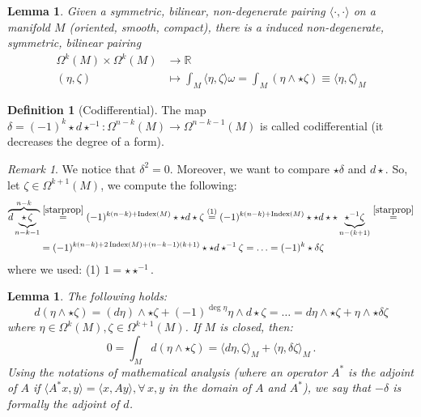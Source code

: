 \documentclass[a4paper,11pt,titlepage, article, oneside]{memoir}
\numberwithin{equation}{section}
\newtheorem{lemma}[theorem]{Lemma}
\theoremstyle{definition}
\newtheorem{definition}[theorem]{Definition}
\theoremstyle{remark}
\newtheorem{remark}[theorem]{Remark}
\DeclareMathOperator{\Index}{Index}
\newcommand{\rfield}{\mathbb{R}}
\begin{document}
\begin{lemma}
Given a symmetric, bilinear, non-degenerate pairing $\langle\cdot, \cdot \rangle$ on a manifold $M$ (oriented, smooth, compact), there is a induced non-degenerate, symmetric, bilinear pairing
\begin{align}
\Omega^k(M) \times \Omega^k(M) &\rightarrow \rfield \\
(\eta, \zeta) &\mapsto \int_M\langle \eta, \zeta \rangle \omega = \int_M (\eta \wedge \star \zeta) \equiv \langle \eta, \zeta \rangle_M \nonumber
\end{align}
 \end{lemma}

\begin{definition} [Codifferential]
The map $\delta = (-1)^k \star d \star^{-1} \colon \Omega^{n-k}(M) \rightarrow \Omega^{n-k-1}(M)$ is called codifferential (it decreases the degree of a form).
\end{definition}

\begin{remarkbox}\begin{remark}
We notice that $\delta^2 = 0$. Moreover, we want to compare $\star \delta $ and $d \star$. So, let $\zeta \in \Omega^{k+1}(M)$, we compute the following:
\begin{align*}
\overbrace{d \underbrace{\star\, \zeta}_{n-k-1}}^{n-k} &\overset{\eqref{starprop}}{=} (-1)^{k(n-k) + \Index(M)} \star \star d \star \zeta \overset{(1)}{=} (-1)^{k(n-k) + \Index(M)} \star \star d \star \star \underbrace{\star^{-1} \zeta}_{n-(k+1)} \overset{\eqref{starprop}}{=} \\
&=(-1)^{k(n-k) + 2\Index(M) + (n-k-1)(k+1)} \star \star d \star^{-1} \zeta = \ldots = (-1)^k \star \delta \zeta
\end{align*}
where we used: (1) $1=\star \star^{-1}$.
\end{remark}\end{remarkbox}

\begin{lemma} The following holds:
\begin{equation}
d(\eta \wedge \star \zeta) = (d\eta) \wedge \star \zeta + (-1)^{\deg \eta} \eta \wedge d \star \zeta = \ldots = d \eta \wedge \star \zeta + \eta \wedge \star \delta \zeta
\end{equation}
where $\eta \in \Omega^k(M), \zeta \in \Omega^{k+1}(M)$. If $M$ is closed, then:
\begin{equation}
0 = \int_M d(\eta \wedge \star \zeta) = \langle d \eta, \zeta \rangle_M + \langle \eta, \delta \zeta \rangle_M \, .
\end{equation}
Using the notations of mathematical analysis (where an operator $A^*$ is the adjoint of $A$ if $\langle A^*x,  y \rangle = \langle x, Ay \rangle, \forall\, x, y  $ in the domain of $A$ and $A^*$), we say that $-\delta$ is formally the adjoint of $d$.
\end{lemma}
\end{document}
